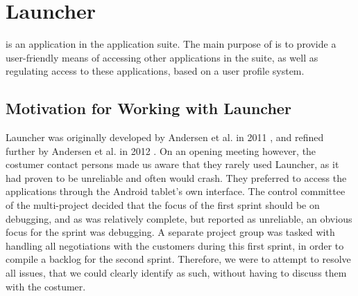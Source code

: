 \section{Launcher}
\launcher is an application in the \giraf application suite.
The main purpose of \launcher is to provide a user-friendly means of accessing other applications in the \giraf suite, as well as regulating access to these applications, based on a user profile system.

\subsection{Motivation for Working with Launcher}
Launcher was originally developed by Andersen et al. in 2011 \cite{launcher2011}, and refined further by Andersen et al. in 2012 \cite{launcher2012}.
On an opening meeting however, the costumer contact persons made us aware that they rarely used Launcher, as it had proven to be unreliable and often would crash. 
They preferred to access the \giraf applications through the Android tablet's own interface.
The control committee of the multi-project decided that the focus of the first sprint should be on debugging, and as \launcher was relatively complete, but reported as unreliable, an obvious focus for the sprint was debugging. 
A separate project group was tasked with handling all negotiations with the customers during this first sprint, in order to compile a backlog for the second sprint.
Therefore, we were to attempt to resolve all issues, that we could clearly identify as such, without having to discuss them with the costumer.

